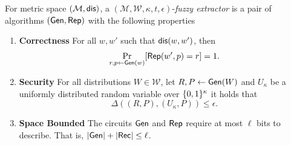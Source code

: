 \begin{definition}
For metric space $(\mathcal{M}, \mathsf{dis})$, a $(\mathcal{M}, \mathcal{W}, \kappa, t, \epsilon)$-\emph{fuzzy extractor} is a pair of algorithms $({\mathsf{Gen}}, {\mathsf{Rep}})$ with the following properties 
\begin{enumerate} 
\itemsep0em
\item \textbf{Correctness} For all $w, w'$ such that $\mathsf{dis}(w, w')$, then 
\[\Pr_{r, p \leftarrow {\ensuremath{\mathsf{Gen}}}(w)}[{\mathsf{Rep}}(w', p) = r]=1.\] 
\item \textbf{Security} For all distributions $W \in \mathcal{W}$, let $R, P \leftarrow {\ensuremath{\mathsf{Gen}}}(W)$ and $U_\kappa$ be a uniformly distributed random variable over $\{0, 1\}^\kappa$ it holds that \[\Delta((R, P), (U_\kappa, P))\le \epsilon.\]
\item  \textbf{Space Bounded} The circuits ${\mathsf{Gen}}$ and ${\mathsf{Rep}}$ require at most $\ell$ bits to describe.  That is, $|{\mathsf{Gen}}| +|{\mathsf{Rec}}|\le \ell$.
\end{enumerate}
\end{definition}


